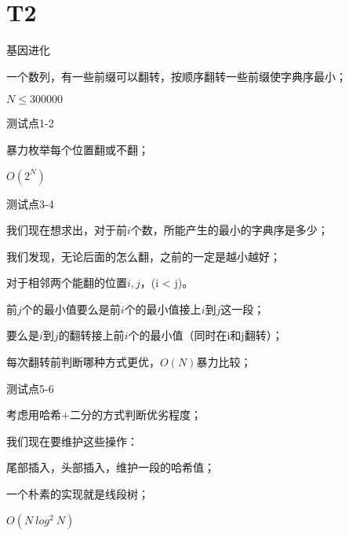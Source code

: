 \documentclass{beamer}
\begin{document}
\section{T2}
\begin{frame}{基因进化}

	\par 一个数列，有一些前缀可以翻转，按顺序翻转一些前缀使字典序最小；

	\par $N \leq 300000$

\end{frame}

\begin{frame}{测试点1-2}

	\par 暴力枚举每个位置翻或不翻；

	\pause

	\par $O(2^N)$

\end{frame}

\begin{frame}{测试点3-4}

	\par 我们现在想求出，对于前$i$个数，所能产生的最小的字典序是多少；

	\pause

	\par 我们发现，无论后面的怎么翻，之前的一定是越小越好；

	\pause

	\par 对于相邻两个能翻的位置$i,j$，(i < j)。

	\pause

	\par 前$j$个的最小值要么是前$i$个的最小值接上$i$到$j$这一段；

	\par 要么是$i$到$j$的翻转接上前$i$个的最小值（同时在i和j翻转）；

	\pause

	\par 每次翻转前判断哪种方式更优，$O(N)$暴力比较；
\end{frame}

\begin{frame}{测试点5-6}

	\par 考虑用哈希+二分的方式判断优劣程度；

	\par 我们现在要维护这些操作：

	\pause

	\par 尾部插入，头部插入，维护一段的哈希值；

	\pause

	\par 一个朴素的实现就是线段树；

	\pause

	\par $O(N\ log^2\ N)$

\end{frame}
\end{document}
